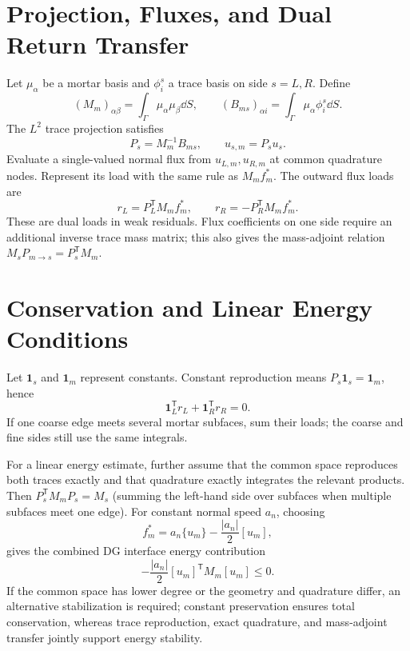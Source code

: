 \section{Projection, Fluxes, and Dual Return Transfer}
Let $\mu_\alpha$ be a mortar basis and $\phi_i^s$ a trace basis on side $s=L,R$. Define
\[
(M_m)_{\alpha\beta}=\int_\Gamma\mu_\alpha\mu_\beta\dd S,\qquad
(B_{ms})_{\alpha i}=\int_\Gamma\mu_\alpha\phi_i^s\dd S.
\]
The $L^2$ trace projection satisfies
\begin{equation}\label{eq:mortar-proj}
P_s=M_m^{-1}B_{ms},\qquad u_{s,m}=P_su_s.
\end{equation}
Evaluate a single-valued normal flux from $u_{L,m},u_{R,m}$ at common quadrature nodes.
Represent its load with the same rule as $M_mf_m^*$. The outward flux loads are
\begin{equation}\label{eq:mortar-return}
r_L=P_L^{\mathsf T}M_mf_m^*,\qquad
r_R=-P_R^{\mathsf T}M_mf_m^*.
\end{equation}
These are dual loads in weak residuals. Flux coefficients on one side require an additional inverse trace mass matrix;
this also gives the mass-adjoint relation $M_sP_{m\to s}=P_s^{\mathsf T}M_m$.

\section{Conservation and Linear Energy Conditions}
Let $\bm1_s$ and $\bm1_m$ represent constants. Constant reproduction means
$P_s\bm1_s=\bm1_m$, hence
\[
\bm1_L^{\mathsf T}r_L+\bm1_R^{\mathsf T}r_R=0.
\]
If one coarse edge meets several mortar subfaces, sum their loads;
the coarse and fine sides still use the same integrals.

For a linear energy estimate, further assume that the common space reproduces both traces exactly and that quadrature exactly integrates the relevant products. Then $P_s^{\mathsf T}M_mP_s=M_s$ (summing the left-hand side over subfaces when multiple subfaces meet one edge). For constant normal speed $a_n$, choosing
\[
f_m^*=a_n\{u_m\}-\frac{|a_n|}{2}[u_m],
\]
gives the combined DG interface energy contribution
\[
-\frac{|a_n|}{2}[u_m]^{\mathsf T}M_m[u_m]\le0.
\]
If the common space has lower degree or the geometry and quadrature differ, an alternative stabilization is required; constant preservation ensures total conservation, whereas trace reproduction, exact quadrature, and mass-adjoint transfer jointly support energy stability.

